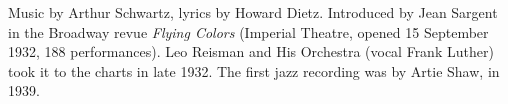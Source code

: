 \begin{notes}[History]
Music by Arthur Schwartz, lyrics by Howard Dietz. Introduced by Jean Sargent in the
Broadway revue \emph{Flying Colors} (Imperial Theatre, opened 15 September 1932, 188 performances).
Leo Reisman and His Orchestra (vocal Frank Luther) took it to the charts in late 1932.
The first jazz recording was by Artie Shaw, in 1939.
\end{notes}
